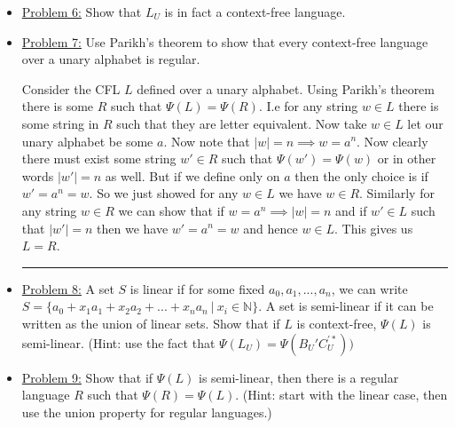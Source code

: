 \documentclass[11pt]{article}
\newenvironment{proof}{{\bf Proof:}}{\hfill\rule{2mm}{2mm}}
\begin{document}
 \hbreak \newline
\begin{itemize}
\item\underline{Problem 6:} Show that $L_U$ is in fact a context-free language. \hbreak \newline


\item \underline{Problem 7:} Use Parikh's theorem to show that every context-free language over a unary alphabet is regular. \hbreak \newline

  \begin{proof}
  Consider the CFL $L$ defined over a unary alphabet. Using Parikh's theorem there is some $R$ such that $\Psi(L) = \Psi(R)$. I.e for any string $w \in L$ there is some string in $R$ such that they are letter equivalent. Now take $w \in L$ let our unary alphabet be some $a$. Now note that $|w| = n \implies w = a^{n}$. Now clearly there must exist some string $w' \in R$ such that $\Psi(w') = \Psi(w)$ or in other words $|w'| = n$ as well. But if we define only on $a$ then the only choice is if $w' = a^{n} = w$. So we just showed for any $w \in L$ we have $w \in R$. Similarly for any string $w \in R$ we can show that if $ w= a^{n} \implies |w| = n$ and if $w' \in L$ such that $|w'| = n$ then we have $w' = a^{n} = w$  and hence $w \in L$. This gives us $L = R$.
  \end{proof}

\item \underline{Problem 8:} A set $S$ is linear if for some fixed $a_0, a_1, ..., a_n$, we can write $S = \{a_0 + x_1a_1 + x_2a_2 + ... + x_na_n ~|~ x_i \in \mathbb{N}\}$. A set is semi-linear if it can be written as the union of linear sets. Show that if $L$ is context-free, $\Psi(L)$ is semi-linear. (Hint: use the fact that $\Psi(L_U) = \Psi(B_U'C_U^{'*}))$ \hbreak \newline

\item \underline{Problem 9:} Show that if $\Psi(L)$ is semi-linear, then there is a regular language $R$ such that $\Psi(R) = \Psi(L)$. (Hint: start with the linear case, then use the union property for regular languages.)

\end{itemize}
\end{document}
